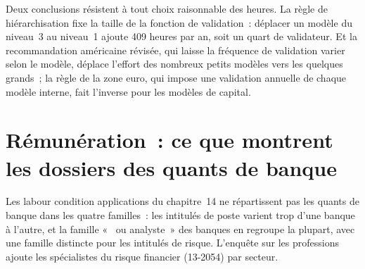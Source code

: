 \begin{omfigure}

\label{fig:in:bank-quant:headcount}
\end{omfigure}

Deux conclusions résistent à tout choix raisonnable des heures. La règle de hiérarchisation fixe la taille de la fonction de validation~: déplacer
un modèle du niveau~3 au niveau~1 ajoute 409 heures par an, soit un quart de validateur. Et la recommandation américaine révisée, qui
laisse la fréquence de validation varier selon le modèle, déplace l'effort des nombreux petits modèles vers les quelques grands~;
la règle de la zone euro, qui impose une validation annuelle de chaque modèle interne, fait l'inverse pour les modèles de capital.

\section{Rémunération~: ce que montrent les dossiers des quants de banque}

Les labour condition applications du chapitre~14 ne répartissent pas les quants de banque dans les quatre familles~: les intitulés de poste varient trop
d'une banque à l'autre, et la famille «~ ou analyste~» des banques en regroupe la plupart, avec une famille distincte
pour les intitulés de risque. L'enquête sur les professions ajoute les spécialistes du risque financier (13-2054) par secteur.

